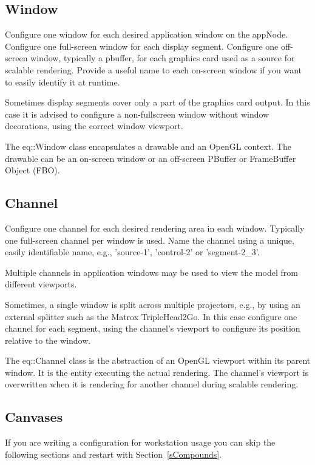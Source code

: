 \documentclass[10pt,a4]{scrartcl}
\newcommand{\sref}[1]{Section~\ref{#1}}
\begin{document}
\subsection{Window}

Configure one \textsf{window} for each desired application window on the
appNode. Configure one full-screen window for each display
segment. Configure one off-screen window, typically a pbuffer, for each
graphics card used as a source for scalable rendering. Provide a useful
name to each on-screen window if you want to easily identify it at runtime.

Sometimes display segments cover only a part of the graphics card
output. In this case it is advised to configure a non-fullscreen window
without window decorations, using the correct window viewport.

The \textsf{eq::Window} class encapsulates a drawable and an OpenGL
context. The drawable can be an on-screen window or an off-screen
PBuffer or FrameBuffer Object (FBO).

\subsection{Channel}

Configure one \textsf{channel} for each desired rendering area in each
window. Typically one full-screen channel per window is used. Name the
channel using a unique, easily identifiable name, e.g., 'source-1',
'control-2' or 'segment-2\_3'.

Multiple channels in application windows may be used to view the model
from different viewports.

Sometimes, a single window is split across multiple projectors, e.g., by
using an external splitter such as the Matrox TripleHead2Go. In this
case configure one channel for each segment, using the channel's
\textsf{viewport} to configure its position relative to the window.

The \textsf{eq::Channel} class is the abstraction of an OpenGL viewport
within its parent window. It is the entity executing the actual
rendering. The channel's viewport is overwritten when it is rendering
for another channel during scalable rendering.


\subsection{\label{sCanvas}Canvases}

If you are writing a configuration for workstation usage you can skip
the following sections and restart with \sref{sCompounds}.
\end{document}
